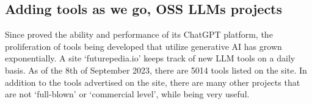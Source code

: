 \subsection{Adding tools as we go, OSS LLMs projects}
Since \openai  proved the ability and performance of its ChatGPT platform, the proliferation of tools being developed that utilize generative AI has grown exponentially.
A site `futurepedia.io' keeps track of new LLM tools on a daily basis.
As of the 8th of September 2023, there are 5014 tools listed on the site.
In addition to the tools advertised on the site, there are many other projects that are not `full-blown' or `commercial level', while being very useful.